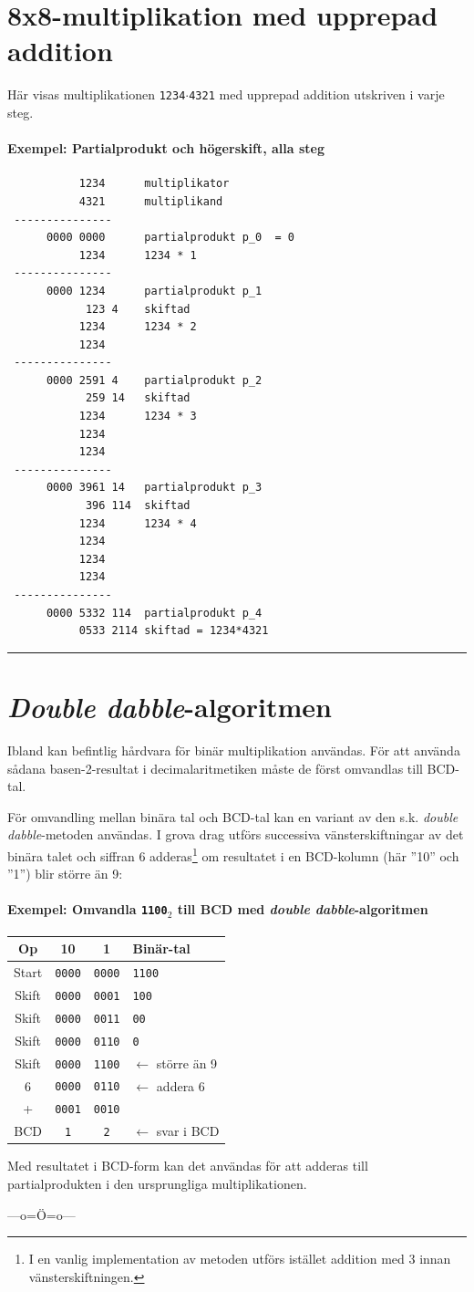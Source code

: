 \documentclass[oneside,10pt,a4paper,swedish]{scrbook}
\newcommand{\startex}[1]{\subsubsection{Exempel: #1}}
\newcommand{\slutex}{\vspace{-8mm}\begin{flushright} \rule{1ex}{1ex} \end{flushright}}
\newcommand{\asm}[1]{\texttt{#1}}
\begin{document}
\chapter{8x8-multiplikation med upprepad addition}
Här visas multiplikationen \asm{1234}$\cdot$\asm{4321} med upprepad addition utskriven i varje steg.
\startex{Partialprodukt och högerskift, alla steg}
\begin{center}
\begin{lstlisting}
           1234	     multiplikator
           4321      multiplikand
 ---------------
      0000 0000      partialprodukt p_0  = 0
           1234      1234 * 1
 ---------------
      0000 1234      partialprodukt p_1
            123 4    skiftad      
           1234      1234 * 2
           1234      
 ---------------
      0000 2591 4    partialprodukt p_2
            259 14   skiftad
           1234      1234 * 3
           1234
           1234
 ---------------     
      0000 3961 14   partialprodukt p_3
            396 114  skiftad
           1234      1234 * 4
           1234
           1234
           1234
 ---------------
      0000 5332 114  partialprodukt p_4 
           0533 2114 skiftad = 1234*4321
\end{lstlisting}
\end{center}
\slutex

\chapter{\emph{Double dabble}-algoritmen}

Ibland kan befintlig hårdvara för binär multiplikation användas. För att använda sådana basen-2-resultat i decimalaritmetiken måste de först omvandlas till BCD-tal.

För omvandling mellan binära tal och BCD-tal kan en variant av den s.k. \emph{double dabble}-metoden användas. I grova drag utförs successiva vänsterskiftningar av det binära talet och siffran 6 adderas\footnote{I en vanlig implementation av metoden utförs istället addition med 3 innan vänsterskiftningen.} om resultatet i en BCD-kolumn (här ''10'' och ''1'') blir större än 9:

\startex{Omvandla \asm{1100}$_2$ till BCD med \emph{double dabble}-algoritmen}
\begin{center}
\begin{tabular}{c|c|c|l}
Op & 10 & 1 & Binär-tal\\
\hline
Start & \asm{0000} & \asm{0000}&\asm{1100}\\
Skift & \asm{0000} & \asm{0001}&\asm{100}\\
Skift & \asm{0000} & \asm{0011}&\asm{00}\\
Skift & \asm{0000} & \asm{0110}&\asm{0}\\
Skift & \asm{0000} & \asm{1100}&$\leftarrow$ större än 9\\
6	  & \asm{0000} & \asm{0110}&$\leftarrow$ addera 6\\
+     & \asm{0001} & \asm{0010}&\asm{}\\
\hline
BCD & \asm{1} & \asm{2}&$\leftarrow$ svar i BCD\\
\end{tabular}
\end{center}

Med resultatet i BCD-form kan det användas för att adderas till partialprodukten i den ursprungliga multiplikationen.

\begin{center}---o=Ö=o---\end{center}
\end{document}
